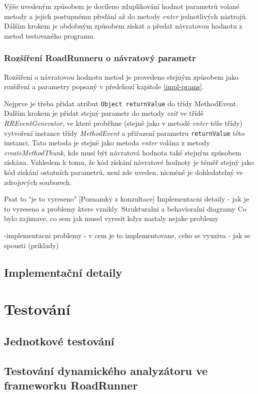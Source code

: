Výše uvedeným způsobem je docíleno zduplikování hodnot parametrů volané metody a jejich postupnému předání až do metody \textit{enter} jednotlivých nástrojů. Dálším krokem je obdobným způsobem získat a předat návratovou hodnotu z metod testovaného programu.

\subsection{Rozšíření RoadRunneru o návratový parametr}\label{impl-ret-pram}

Rozšíření o návratovou hodnotu metod je provedeno stejným způsobem jako rozšíření a parametry popsaný v předchozí kapitole \ref{impl-prams}.

Nejprve je třeba přidat atribut \texttt{Object returnValue} do třídy MethodEvent. Dalším krokem je přidat stejný parametr do metody \textit{exit} ve třídě \textit{RREventGenerator}, ve které proběhne (stejně jako v metodě \textit{enter} téže třídy) vytvoření instance třídy \textit{MethodEvent} a přiřazení parametru \texttt{returnValue} této instanci. Tato metoda je stejně jako metoda \textit{enter} volána z metody \textit{createMethodThunk}, kde musí být návratová hodnota také stejným způsobem získána. Vzhledem k tomu, že kód získání návratové hodnoty je téměř stejný jako kód získání ostatních parametrů, není zde uveden, nicméně je dohledatelný ve zdrojových souborech.


Psat to "je to vyreseno"
[Poznamky z konzultace] Implementacni detaily - jak je to vyreseno a problemy ktere vznikly. Strukturalni a behavioralni diagramy
Co bylo zajimave, co sem jak musel vyresit kdyz nastaly nejake problemy

-implementacni problemy
- v cem je to implementovane, ceho se vyuziva
- jak se spousti (priklady)


\section{Implementační detaily}


\chapter{Testování}

\section{Jednotkové testování}

\section{Testování dynamického analyzátoru ve frameworku RoadRunner}

